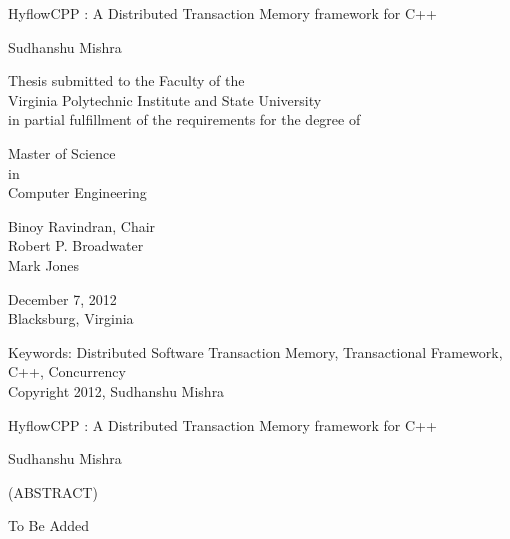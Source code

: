 \documentclass[12pt,english]{report}
\begin{document}
\thispagestyle{empty}
\begin{center}

{\Large 
HyflowCPP : A Distributed Transaction Memory framework for C++
}

\vfill

Sudhanshu Mishra

\vfill

Thesis submitted to the Faculty of the \\
Virginia Polytechnic Institute and State University \\
in partial fulfillment of the requirements for the degree of

\vfill

Master of Science \\
in \\
Computer Engineering


\vfill

Binoy Ravindran, Chair \\
Robert P. Broadwater \\
Mark Jones


\vfill

December 7, 2012 \\
Blacksburg, Virginia

\vfill

Keywords: Distributed Software Transaction Memory, Transactional Framework, C++, Concurrency
\\
Copyright 2012, Sudhanshu Mishra

\end{center}

\pagebreak

\thispagestyle{empty}
\begin{center}

{\large
HyflowCPP : A Distributed Transaction Memory framework for C++
}

\vfill

Sudhanshu Mishra

\vfill

(ABSTRACT)

\vfill

\end{center}

To Be Added




\vfill


\end{document}
